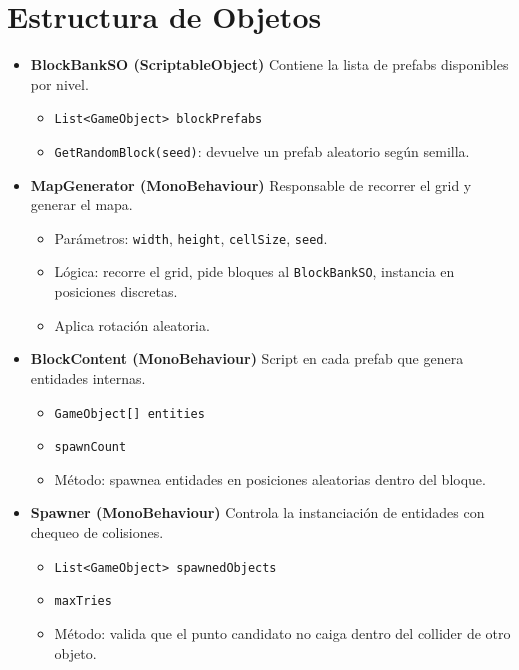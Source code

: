 \documentclass[a4paper,12pt]{article}
\begin{document}
\section{Estructura de Objetos}
\begin{itemize}
    \item \textbf{BlockBankSO (ScriptableObject)}  
    Contiene la lista de prefabs disponibles por nivel.  
    \begin{itemize}
        \item \texttt{List<GameObject> blockPrefabs}
        \item \texttt{GetRandomBlock(seed)}: devuelve un prefab aleatorio según semilla.
    \end{itemize}

    \item \textbf{MapGenerator (MonoBehaviour)}  
    Responsable de recorrer el grid y generar el mapa.  
    \begin{itemize}
        \item Parámetros: \texttt{width}, \texttt{height}, \texttt{cellSize}, \texttt{seed}.
        \item Lógica: recorre el grid, pide bloques al \texttt{BlockBankSO}, instancia en posiciones discretas.
        \item Aplica rotación aleatoria.
    \end{itemize}

    \item \textbf{BlockContent (MonoBehaviour)}  
    Script en cada prefab que genera entidades internas.  
    \begin{itemize}
        \item \texttt{GameObject[] entities}
        \item \texttt{spawnCount}
        \item Método: spawnea entidades en posiciones aleatorias dentro del bloque.
    \end{itemize}

    \item \textbf{Spawner (MonoBehaviour)}  
    Controla la instanciación de entidades con chequeo de colisiones.  
    \begin{itemize}
        \item \texttt{List<GameObject> spawnedObjects}
        \item \texttt{maxTries}
        \item Método: valida que el punto candidato no caiga dentro del collider de otro objeto.
    \end{itemize}
\end{itemize}
\end{document}

